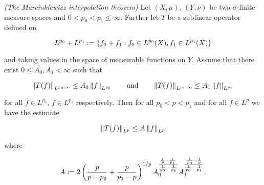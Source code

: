 \begin{mdframed}
	\begin{theorem}\emph{(The Marcinkiewicz interpolation theorem)}
		Let $(X,\mu)$, $(Y,\nu)$ be two $\sigma$-finite measure spaces and $0 < p_0 < p_1 \leq \infty$. Further let $T$ be a sublinear operator defined on
		
		\begin{equation*}
			L^{p_0} + L^{p_1} := \cbr[0]{ f_0 + f_1 : f_0 \in L^{p_0}(X), f_1 \in L^{p_1}(X)}
		\end{equation*}
		
		\noindent and taking values in the space of measurable functions on $Y$. Assume that there exist $0 \leq A_0,A_1 < \infty$ such that

		\begin{equation}
			\norm[0]{T(f)}_{L^{p_0,\infty}} \leq A_0 \norm[0]{f}_{L^{p_0}} \qquad \text{and} \qquad \norm[0]{T(f)}_{L^{p_1,\infty}} \leq A_1 \norm[0]{f}_{L^{p_1}}\label{hyp:fp_0fp_1}
		\end{equation}

		\noindent for all $f \in L^{p_0}$, $f \in L^{p_1}$ respectively. Then for all $p_0 < p < p_1$ and for all $f \in L^p$ we have the estimate

		\begin{equation}
			\norm[0]{T(f)}_{L^p} \leq A \norm[0]{f}_{L^p}
		\end{equation}

		\noindent where

		\begin{equation}
			A := 2\del[3]{ \frac{p}{p - p_0} + \frac{p}{p_1 - p} }^{1/p}A_0^{\frac{\frac{1}{p} - \frac{1}{p_1}}{\frac{1}{p_0}-\frac{1}{p_1}}}A_1^{\frac{\frac{1}{p_0}-\frac{1}{p}}{\frac{1}{p_0}-\frac{1}{p_1}}}.
			\label{eq:constant}
		\end{equation}
	\end{theorem}
\end{mdframed}

